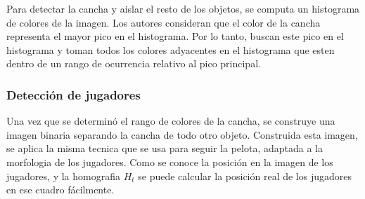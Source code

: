 \documentclass[a4paper,10pt]{article}
\begin{document}
Para detectar la cancha y aislar el resto de los objetos, se computa un histograma de colores de la imagen.
Los autores consideran que el color de la cancha representa el mayor pico en el histograma.
Por lo tanto, buscan este pico en el histograma y toman todos los colores adyacentes en el histograma que esten dentro de un rango de ocurrencia relativo al pico principal.

\subsubsection*{Detección de jugadores}

Una vez que se determinó el rango de colores de la cancha, se construye una imagen binaria separando la cancha de todo otro objeto.
Construida esta imagen, se aplica la misma tecnica que se usa para seguir la pelota, adaptada a la morfologia de los jugadores.
Como se conoce la posición en la imagen de los jugadores, y la homografia $H_t$ se puede calcular la posición real de los jugadores en ese cuadro fácilmente.

\printbibliography
\end{document}
